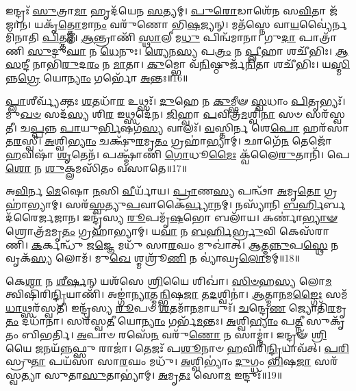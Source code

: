 𑌇𑌨𑍍𑌦𑍍𑌰𑌃᳴ \ul{𑌸𑍁}\-𑌤𑍍𑌰𑌾\-\ul{𑌮𑌾} 𑌹𑍃𑌦᳴𑌯𑍇𑌨 \ul{𑌸}\-𑌤𑍍𑌯𑌮𑍍।
\-\ul{𑌪𑍁}\-\-\ul{𑌰𑍋}\-𑌡𑌾𑌶𑍇᳴𑌨 𑌸\-\ul{𑌵𑌿}\-𑌤𑌾 𑌜᳴𑌜𑌾𑌨।
𑌯𑌕𑍃᳴\-\ul{𑌤𑍍𑌕𑍍𑌲𑍋}\-𑌮𑌾\-\ul{𑌨𑌂} 𑌵𑌰𑍁᳴𑌣𑍋 𑌭𑌿\-\ul{𑌷}\-𑌜𑍍𑌯𑌨𑍍।
𑌮𑌤᳴𑌸𑍍𑌨𑍇 𑌵𑌾\-\ul{𑌯}\-𑌵𑍍𑌯𑍈॑𑌰𑍍𑌨 𑌮𑌿᳴𑌨𑌾𑌤𑌿 \ul{𑌪𑌿}\-𑌤𑍍𑌤𑌮𑍍।
\-\ul{𑌆}\-𑌨𑍍𑌤𑍍𑌰𑌾𑌣𑌿᳴ \ul{𑌸𑍍𑌥𑌾}\-𑌲𑍀 𑌮\-\ul{𑌧𑍁} 𑌪𑌿𑌨𑍍𑌵᳴𑌮𑌾𑌨𑌾।
𑌗𑍁\-\ul{𑌦𑌾} 𑌪𑌾𑌤𑍍𑌰𑌾᳴𑌣𑌿 \ul{𑌸𑍁}\-𑌦𑍁\-\ul{𑌘𑌾} 𑌨 \ul{𑌧𑍇}\-𑌨𑍁𑌃।
\-\ul{𑌶𑍍𑌯𑍇}\-𑌨\-\ul{𑌸𑍍𑌯} 𑌪\-\ul{𑌤𑍍𑌰𑌂} 𑌨 \ul{𑌪𑍍𑌲𑍀}\-𑌹𑌾 𑌶𑌚𑍀᳴𑌭𑌿𑌃।
\-\ul{𑌆}\-\-\ul{𑌸}\-𑌨𑍍𑌦𑍀 𑌨𑌾𑌭𑌿᳴\-\ul{𑌰𑍁}\-𑌦\-\ul{𑌰𑌂} 𑌨 \ul{𑌮𑌾}\-𑌤𑌾।
\-\ul{𑌕𑍁}\-𑌮𑍍𑌭𑍋 𑌵᳴\-\ul{𑌨𑌿}\-𑌷𑍍𑌠𑍁𑌰𑍍𑌜᳴\-\ul{𑌨𑌿}\-𑌤𑌾 𑌶𑌚𑍀᳴𑌭𑌿𑌃।
𑌯\-\ul{𑌸𑍍𑌮𑌿}\-𑌨𑍍𑌨\-\ul{𑌗𑍍𑌰𑍇} 𑌯𑍋\-\ul{𑌨𑍍𑌯𑌾𑌂} 𑌗𑌰𑍍𑌭𑍋᳴ \ul{𑌅}\-𑌨𑍍𑌤𑌃॥16॥

\-\ul{𑌪𑍍𑌲𑌾}\-𑌶𑍀𑌰𑍍𑌵𑍍𑌯᳴𑌕𑍍𑌤𑌃 \ul{𑌶}\-𑌤𑌧𑌾᳴\-\ul{𑌰} 𑌉𑌥𑍍𑌸𑌃᳴।
\-\ul{𑌦𑍁}\-𑌹𑍇 𑌨 \ul{𑌕𑍁}\-𑌮𑍍𑌭𑍀𑍟 \ul{𑌸𑍍𑌵}\-𑌧𑌾𑌂 \ul{𑌪𑌿}\-𑌤𑍃𑌭𑍍𑌯𑌃᳴।
𑌮𑍁\-\ul{𑌖}\-\-\ul{𑍞} 𑌸𑌦᳴\-\ul{𑌸𑍍𑌯} 𑌶𑌿\-\ul{𑌰} 𑌇𑌥𑍍𑌸𑌦𑍇᳴𑌨।
\-\ul{𑌜𑌿}\-𑌹𑍍𑌵𑌾 \ul{𑌪}\-𑌵𑌿𑌤𑍍𑌰᳴\-\ul{𑌮}\-𑌶𑍍𑌵𑌿\-\ul{𑌨𑌾} 𑌸𑍞 𑌸𑌰᳴𑌸𑍍𑌵𑌤𑍀।
𑌚\-\ul{𑌪𑍍𑌪}\-𑌨𑍍𑌨 \ul{𑌪𑌾}\-𑌯𑍁\-\ul{𑌰𑍍𑌭𑌿}\-𑌷𑌗᳴\-\ul{𑌸𑍍𑌯} 𑌵𑌾𑌲𑌃᳴।
\-\ul{𑌵}\-𑌸𑍍𑌤𑌿𑌰𑍍𑌨 𑌶𑍇\-\ul{𑌪𑍋} 𑌹𑌰᳴𑌸𑌾 𑌤\-\ul{𑌰}\-𑌸𑍍𑌵𑍀।
\-\ul{𑌅}\-𑌶𑍍𑌵𑌿\-\ul{𑌭𑍍𑌯𑌾𑌂} 𑌚𑌕𑍍𑌷𑍁᳴\-\ul{𑌰}\-𑌮𑍃\-\ul{𑌤𑌂} 𑌗𑍍𑌰𑌹𑌾॑𑌭𑍍𑌯𑌾𑌮𑍍।
𑌛𑌾𑌗𑍇᳴\-\ul{𑌨} 𑌤𑍇𑌜𑍋᳴ \ul{𑌹}\-𑌵𑌿𑌷𑌾᳴ \ul{𑌶𑍃}\-𑌤𑍇𑌨᳴।
𑌪𑌕𑍍𑌷𑍍𑌮𑌾᳴𑌣𑌿 \ul{𑌗𑍋}\-𑌧𑍂\-\ul{𑌮𑍈𑌃} 𑌕𑍍𑌵᳴𑌲𑍈\-\ul{𑌰𑍁}\-𑌤𑌾𑌨𑌿᳴।
𑌪𑍇\-\ul{𑌶𑍋} 𑌨 \ul{𑌶𑍁}\-𑌕𑍍𑌲𑌮𑌸𑌿᳴𑌤𑌂 𑌵𑌸𑌾𑌤𑍇॥17॥

𑌅\-\ul{𑌵𑌿}\-𑌰𑍍𑌨 \ul{𑌮𑍇}\-𑌷𑍋 \ul{𑌨}\-𑌸𑌿 \ul{𑌵𑍀}\-𑌰𑍍𑌯𑌾᳴𑌯।
\-\ul{𑌪𑍍𑌰𑌾}\-𑌣\-\ul{𑌸𑍍𑌯} 𑌪𑌨𑍍𑌥𑌾᳴ \ul{𑌅}\-𑌮𑍃\-\ul{𑌤𑍋} 𑌗𑍍𑌰𑌹𑌾॑𑌭𑍍𑌯𑌾𑌮𑍍।
𑌸𑌰᳴\-\ul{𑌸𑍍𑌵}\-𑌤𑍍𑌯𑍁\-\ul{𑌪}\-𑌵𑌾𑌕𑍈॑\-\ul{𑌰𑍍𑌵𑍍𑌯𑌾}\-𑌨𑌮𑍍।
𑌨𑌸𑍍𑌯𑌾᳴𑌨𑌿 \ul{𑌬}\-\-\ul{𑌰𑍍}\-𑌹𑌿𑌰𑍍𑌬𑌦᳴𑌰𑍈𑌰𑍍𑌜𑌜𑌾𑌨।
𑌇𑌨𑍍𑌦𑍍𑌰᳴𑌸𑍍𑌯 \ul{𑌰𑍂}\-𑌪𑌮𑍃᳴\-\ul{𑌷}\-𑌭𑍋 𑌬𑌲𑌾᳴𑌯।
𑌕𑌰𑍍𑌣𑌾॑\-\ul{𑌭𑍍𑌯𑌾}\-\-\ul{𑍟} 𑌶𑍍𑌰𑍋𑌤𑍍𑌰᳴\-\ul{𑌮}\-𑌮𑍃\-\ul{𑌤𑌂} 𑌗𑍍𑌰𑌹𑌾॑𑌭𑍍𑌯𑌾𑌮𑍍।
𑌯\-\ul{𑌵𑌾} 𑌨 \ul{𑌬}\-\-\ul{𑌰𑍍}\-𑌹𑌿\-\ul{𑌰𑍍𑌭𑍍𑌰𑍁}\-𑌵𑌿 𑌕𑍇𑌸᳴𑌰𑌾𑌣𑌿।
\-\ul{𑌕}\-𑌰𑍍𑌕𑌨𑍍𑌧𑍁᳴ 𑌜\-\ul{𑌜𑍍𑌞𑍇} 𑌮𑌧𑍁᳴ 𑌸𑌾\-\ul{𑌰}\-𑌘𑌂 𑌮𑍁𑌖𑌾॑𑌤𑍍।
\-\ul{𑌆}\-𑌤𑍍𑌮\-\ul{𑌨𑍍𑌨𑍁}\-𑌪\-\ul{𑌸𑍍𑌥𑍇} 𑌨 𑌵𑍃𑌕᳴\-\ul{𑌸𑍍𑌯} 𑌲𑍋𑌮᳴।
𑌮𑍁\-\ul{𑌖𑍇} 𑌶𑍍𑌮𑌶𑍍𑌰𑍂᳴\-\ul{𑌣𑌿} 𑌨 𑌵𑍍𑌯𑌾॑𑌘𑍍𑌰\-\ul{𑌲𑍋}\-𑌮𑌮𑍍॥18॥

𑌕𑍇\-\ul{𑌶𑌾} 𑌨 \ul{𑌶𑍀}\-\-\ul{𑌰𑍍}\-𑌷𑌨𑍍‌ 𑌯𑌶᳴𑌸𑍇 \ul{𑌶𑍍𑌰𑌿}\-𑌯𑍈 𑌶𑌿𑌖𑌾॑।
\-\ul{𑌸𑌿}\-\-\ul{𑍞}\-𑌹\-\ul{𑌸𑍍𑌯} 𑌲𑍋\-\ul{𑌮} 𑌤𑍍𑌵𑌿𑌷𑌿᳴𑌰𑌿\-\ul{𑌨𑍍𑌦𑍍𑌰𑌿}\-𑌯𑌾𑌣𑌿᳴।
𑌅𑌙𑍍𑌗𑌾॑\-\ul{𑌨𑍍𑌯𑌾}\-𑌤𑍍𑌮\-\ul{𑌨𑍍𑌭𑌿}\-𑌷\-\ul{𑌜𑌾} 𑌤\-\ul{𑌦}\-𑌶𑍍𑌵𑌿𑌨𑌾॑।
\-\ul{𑌆}\-𑌤𑍍𑌮𑌾\-\ul{𑌨}\-𑌮\-\ul{𑌙𑍍𑌗𑍈𑌃} 𑌸𑌮᳴\-\ul{𑌧𑌾}\-𑌥𑍍𑌸𑌰᳴𑌸𑍍𑌵𑌤𑍀।
𑌇𑌨𑍍𑌦𑍍𑌰᳴𑌸𑍍𑌯 \ul{𑌰𑍂}\-𑌪𑍞 \ul{𑌶}\-𑌤𑌮𑌾᳴\-\ul{𑌨}\-𑌮𑌾𑌯𑍁𑌃᳴।
\-\ul{𑌚}\-𑌨𑍍𑌦𑍍𑌰𑍇\-\ul{𑌣} 𑌜𑍍𑌯𑍋𑌤𑌿᳴\-\ul{𑌰}\-𑌮𑍃\-\ul{𑌤𑌂} 𑌦𑌧𑌾᳴𑌨𑌾।
𑌸𑌰᳴𑌸𑍍𑌵\-\ul{𑌤𑍀} 𑌯𑍋\-\ul{𑌨𑍍𑌯𑌾𑌂} 𑌗𑌰𑍍𑌭᳴\-\ul{𑌮}\-𑌨𑍍𑌤𑌃।
\-\ul{𑌅}\-𑌶𑍍𑌵𑌿\-\ul{𑌭𑍍𑌯𑌾𑌂} 𑌪\-\ul{𑌤𑍍𑌨𑍀} 𑌸𑍁𑌕𑍃᳴𑌤𑌂 𑌬𑌿𑌭𑌰𑍍𑌤𑌿।
\-\ul{𑌅}\-𑌪𑌾𑍞 𑌰𑌸𑍇᳴\-\ul{𑌨} 𑌵𑌰𑍁᳴\-\ul{𑌣𑍋} 𑌨 𑌸𑌾𑌮𑍍𑌨𑌾॑।
𑌇𑌨𑍍𑌦𑍍𑌰𑍟᳴ \ul{𑌶𑍍𑌰𑌿}\-𑌯𑍈 \ul{𑌜}\-𑌨𑌯᳴\-\ul{𑌨𑍍𑌨}\-𑌫𑍍𑌸𑍁 𑌰𑌾𑌜𑌾॑।
𑌤𑍇𑌜𑌃᳴ 𑌪\-\ul{𑌶𑍂}\-𑌨𑌾𑍞 \ul{𑌹}\-𑌵𑌿𑌰𑌿᳴\-\ul{𑌨𑍍𑌦𑍍𑌰𑌿}\-𑌯𑌾𑌵᳴𑌤𑍍।
\-\ul{𑌪}\-\-\ul{𑌰𑌿}\-𑌸𑍍𑌰𑍁\-\ul{𑌤𑌾} 𑌪𑌯᳴𑌸𑌾 𑌸𑌾\-\ul{𑌰}\-𑌘𑌂 𑌮𑌧𑍁᳴।
\-\ul{𑌅}\-𑌶𑍍𑌵𑌿𑌭𑍍𑌯𑌾𑌂॑ \ul{𑌦𑍁}\-𑌗𑍍𑌧𑌂 \ul{𑌭𑌿}\-𑌷\-\ul{𑌜𑌾} 𑌸𑌰᳴𑌸𑍍𑌵𑌤𑍍𑌯𑌾 𑌸𑍁𑌤𑌾\-\ul{𑌸𑍁}\-𑌤𑌾𑌭𑍍𑌯𑌾॑𑌮𑍍।
\-\ul{𑌅}\-𑌮𑍃\-\ul{𑌤𑌃} 𑌸𑍋\-\ul{𑌮} 𑌇𑌨𑍍𑌦𑍁𑌃᳴॥19॥\anuvakamend[𑌅𑌨𑍍𑌤᳴𑌰 \ul{𑌆}\-𑌰𑌾\-\ul{𑌦}\-𑌨𑍍𑌤𑌰𑍍𑌵᳴𑌸𑌾𑌤𑍇 𑌵𑍍𑌯𑌾𑌘𑍍𑌰\-\ul{𑌲𑍋}\-𑌮𑍞 𑌰𑌾𑌜𑌾᳴ \ul{𑌚}\-𑌤𑍍𑌵𑌾𑌰𑌿᳴ 𑌚]

